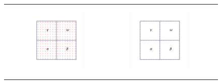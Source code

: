\begin{figure}
    \centering
    \begin{tabular}{ccc}
        \begin{subfigure}[t]{0.3\textwidth}
            \centering
            \includegraphics[width=\textwidth, clip=true, trim={100 150 100 150}]{figures/four_patches.pdf}
            \label{subfig:4_patches_with_grid}
        \end{subfigure}
        &
        \begin{subfigure}[t]{0.3\textwidth}
            \centering
            \includegraphics[width=\textwidth, clip=true, trim={100 150 100 150}]{figures/four_patches_without_points.pdf}

\end{subfigure}
\end{tabular}
\end{figure}

